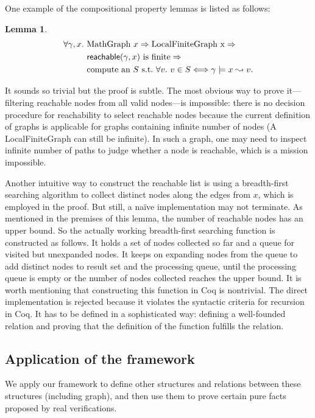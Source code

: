 One example of the compositional property lemmas is listed as follows:
\newtheorem{mylem}{Lemma}
\begin{mylem}\label{lem:computereach}
\[
\begin{split}
\forall \gamma, x.~&\text{MathGraph }x => \text{LocalFiniteGraph x} =>\\
        & \mathsf{reachable}(\gamma, x)\text{ is finite} => \\
        & \text{compute an }S \text{ s.t.\ } \forall v.~v \in S <=>
        \gamma \models x \leadsto v.
\end{split}
\]
\end{mylem}
It sounds so trivial but the proof is subtle. The most obvious way to
prove it---filtering reachable nodes from all valid nodes---is
impossible: there is no decision procedure for reachability to select
reachable nodes because the current definition of graphs is applicable
for graphs containing infinite number of nodes (A LocalFiniteGraph can
still be infinite). In such a graph, one may need to inspect infinite
number of paths to judge whether a node is reachable, which is a
mission impossible.

Another intuitive way to construct the reachable list is using a
breadth-first searching algorithm to collect distinct nodes along the
edges from $x$, which is employed in the proof. But still, a na\"ive
implementation may not terminate. As mentioned in the premises of this
lemma, the number of reachable nodes has an upper bound. So the
actually working breadth-first searching function is constructed as
follows. It holds a set of nodes collected so far and a queue for
visited but unexpanded nodes. It keeps on expanding nodes from the
queue to add distinct nodes to result set and the processing queue,
until the processing queue is empty or the number of nodes collected
reaches the upper bound. It is worth mentioning that constructing this
function in Coq is nontrivial. The direct implementation is rejected
because it violates the syntactic criteria for recursion in Coq. It
has to be defined in a sophisticated way: defining a well-founded
relation and proving that the definition of the function fulfills the
relation.

\subsection{Application of the framework}

We apply our framework to define other structures and relations
between these structures (including graph), and then use them to prove
certain pure facts proposed by real verifications.

